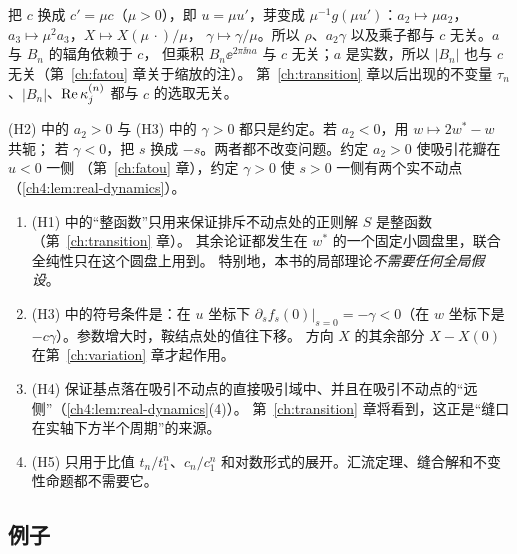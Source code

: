 \begin{remark}[仿射坐标的选择]\label{ch4:rem:affine}
把 $c$ 换成 $c'=\mu c$（$\mu>0$），即 $u=\mu u'$，芽变成 $\mu^{-1}g(\mu u')$：$a_2\mapsto\mu a_2$，$a_3\mapsto\mu^2a_3$，$X\mapsto X(\mu\,\cdot)/\mu$，
$\gamma\mapsto\gamma/\mu$。所以 $\rho$、$a_2\gamma$ 以及乘子都与 $c$ 无关。$a$ 与 $B_n$ 的辐角依赖于 $c$，
但乘积 $B_n\ee^{2\pi\ii na}$ 与 $c$ 无关；$a$ 是实数，所以 $|B_n|$ 也与 $c$ 无关（第~\ref{ch:fatou} 章关于缩放的注）。
第~\ref{ch:transition} 章以后出现的不变量 $\tau_n$、$|B_n|$、$\operatorname{Re}\kappa^{(n)}_j$ 都与 $c$ 的选取无关。
\end{remark}

\begin{remark}[符号约定]\label{ch4:rem:signs}
(H2) 中的 $a_2>0$ 与 (H3) 中的 $\gamma>0$ 都只是约定。若 $a_2<0$，用 $w\mapsto 2w^*-w$ 共轭；
若 $\gamma<0$，把 $s$ 换成 $-s$。两者都不改变问题。约定 $a_2>0$ 使吸引花瓣在 $u<0$ 一侧
（第~\ref{ch:fatou} 章），约定 $\gamma>0$ 使 $s>0$ 一侧有两个实不动点（\cref{ch4:lem:real-dynamics}）。
\end{remark}

\begin{remark}[各条假设的作用]\label{ch4:rem:roles}
\begin{enumerate}
\item (H1) 中的``整函数''只用来保证排斥不动点处的正则解 $S$ 是整函数（第~\ref{ch:transition} 章）。
  其余论证都发生在 $w^*$ 的一个固定小圆盘里，联合全纯性只在这个圆盘上用到。
  特别地，本书的局部理论\emph{不需要任何全局假设}。
\item (H3) 中的符号条件是：在 $u$ 坐标下 $\partial_sf_s(0)|_{s=0}=-\gamma<0$（在 $w$ 坐标下是 $-c\gamma$）。参数增大时，鞍结点处的值往下移。
  方向 $X$ 的其余部分 $X-X(0)$ 在第~\ref{ch:variation} 章才起作用。
\item (H4) 保证基点落在吸引不动点的直接吸引域中、并且在吸引不动点的``远侧''（\cref{ch4:lem:real-dynamics}(4)）。
  第~\ref{ch:transition} 章将看到，这正是``缝口在实轴下方半个周期''的来源。
\item (H5) 只用于比值 $t_n/t_1^n$、$c_n/c_1^n$ 和对数形式的展开。汇流定理、缝合解和不变性命题都不需要它。
\end{enumerate}
\end{remark}

\subsection{例子}

